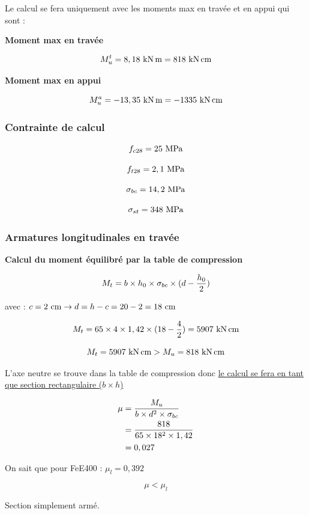 Le calcul se fera uniquement avec les moments max en travée et en appui qui sont : 

\textbf{Moment max en travée}

\[ M_{u}^{t} = 8,18\knxm = 818\knxcm \]

\textbf{Moment max en appui}

\[ M_{u}^{a} = -13,35\knxm = -1335\knxcm \]

\subsubsection{Contrainte de calcul}

\[ f_{c28} = 25\mpa \]

\[ f_{t28} = 2,1\mpa \]

\[ \sgma{bc} = 14,2\mpa \]

\[ \sgma{st} = 348\mpa \]



\subsubsection{Armatures longitudinales en travée}


\textbf{Calcul du moment équilibré par la table de compression} 

\[ M_{t} = b \times h_{0} \times \sigma_{bc} \times (d - \dfrac{h_{0}}{2}) \]

avec : $c = 2\cml \rightarrow d = h - c = 20 - 2 = 18\cml$

\[ M_{t} = 65 \times 4 \times 1,42 \times (18 - \dfrac{4}{2}) = 5907\knxcm \]


\[ M_{t} = 5907\knxcm > M_{u} = 818\knxcm \]

{\centering L'axe neutre se trouve dans la table de compression donc \underline{le calcul se fera en tant que section rectangulaire ($b \times h$)} \par}

\vspace{\baselineskip}

\[ \begin{aligned}
	\mu &= \dfrac{M_{u}}{b \times d^{2} \times \sigma_{bc}} \\
	&= \dfrac{818}{65 \times 18^{2} \times 1,42} \\
	&= 0,027
\end{aligned} \]

On sait que pour FeE400 : $\mu_{l} = 0,392$

\[ \mu < \mu_{l} \]

{\centering Section simplement armé.\par}

